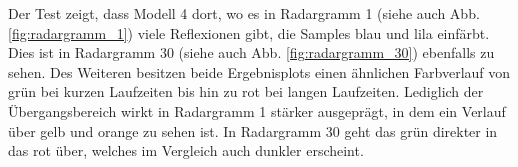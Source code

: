 \noindent Der Test zeigt, dass Modell 4 dort, wo es in Radargramm 1 (siehe auch Abb. \ref{fig:radargramm_1}) viele Reflexionen gibt, die Samples blau und lila einfärbt. Dies ist in Radargramm 30 (siehe auch Abb. \ref{fig:radargramm_30}) ebenfalls zu sehen. Des Weiteren besitzen beide Ergebnisplots einen ähnlichen Farbverlauf von grün bei kurzen Laufzeiten bis hin zu rot bei langen Laufzeiten. Lediglich der Übergangsbereich wirkt in Radargramm 1 stärker ausgeprägt, in dem ein Verlauf über gelb und orange zu sehen ist. In Radargramm 30 geht das grün direkter in das rot über, welches im Vergleich auch dunkler erscheint.